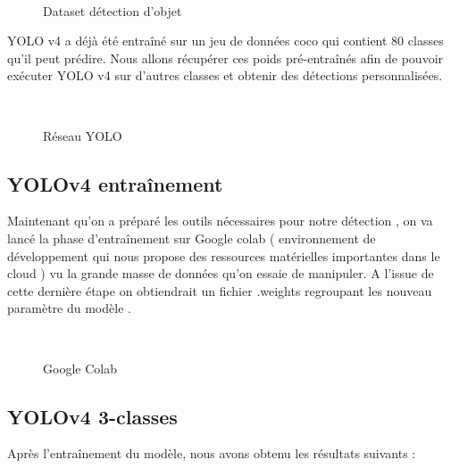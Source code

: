 {\begin{itemize}
\end{itemize}


\begin{figure}[H] 
\centering
{}\\[0.5cm]
\caption{Dataset détection d'objet}
\label{fig:figure14}
\end{figure}

YOLO v4 a déjà été entraîné sur un jeu de données coco qui contient 80 classes qu'il peut prédire. Nous allons récupérer ces poids pré-entraînés afin de pouvoir exécuter YOLO v4 sur d’autres classes et obtenir des détections personnalisées.

\begin{figure}[H] 
\centering
{}\\[0.5cm]
\caption{Réseau YOLO}
\label{fig:figure14}
\end{figure}




\subsection{YOLOv4 entraînement}
Maintenant qu’on a préparé les outils nécessaires pour notre détection , on va lancé la phase d'entraînement sur Google colab ( environnement de développement qui nous propose des ressources matérielles importantes dans le cloud ) vu la grande masse de données qu'on essaie de manipuler.
A l’issue de cette dernière étape on obtiendrait un fichier  .weights regroupant les nouveau paramètre du modèle .

\begin{figure}[H] 
\centering
{}\\[0.5cm]
\caption{Google Colab}
\label{fig:figure17}
\end{figure}

\subsection{YOLOv4 3-classes}
Après l'entraînement du modèle, nous avons obtenu les résultats suivants :  

}
